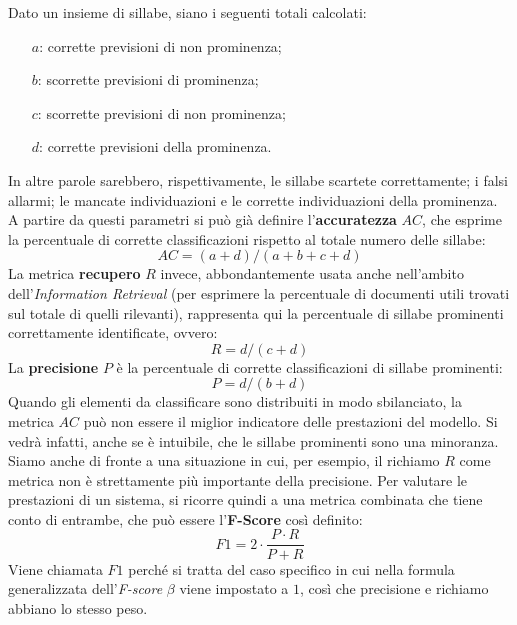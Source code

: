 \documentclass[twoside,twocolumn,11pt]{extarticle}
\theoremstyle{definition}
\begin{document}
		Dato un insieme di sillabe, siano i seguenti totali calcolati:
		\begin{itemize}
			\item[$a$:] corrette previsioni di non prominenza;
			\item[$b$:] scorrette previsioni di prominenza;
			\item[$c$:] scorrette previsioni di non prominenza;
			\item[$d$:] corrette previsioni della prominenza.
		\end{itemize}
		In altre parole sarebbero, rispettivamente, le sillabe scartete correttamente; i falsi allarmi; le mancate individuazioni e le corrette individuazioni della prominenza. A partire da questi parametri si può già definire l'\textbf{accuratezza} $AC$, che esprime la percentuale di corrette classificazioni rispetto al totale numero delle sillabe:
		\begin{equation}\label{eq:ac}
			AC = (a + d) / (a + b + c + d)
		\end{equation}
		La metrica \textbf{recupero} $R$ invece, abbondantemente usata anche nell'ambito dell'\textit{Information Retrieval} (per esprimere la percentuale di documenti utili trovati sul totale di quelli rilevanti), rappresenta qui la percentuale di sillabe prominenti correttamente identificate, ovvero:
		\begin{equation}\label{eq:r}
			R = d / (c + d)
		\end{equation}
		La \textbf{precisione} $P$ è la percentuale di corrette classificazioni di sillabe prominenti:
		\begin{equation}\label{eq:p}
			P = d / (b + d)
		\end{equation}
		Quando gli elementi da classificare sono distribuiti in modo sbilanciato, la metrica $AC$ può non essere il miglior indicatore delle prestazioni del modello. Si vedrà infatti, anche se è intuibile, che le sillabe prominenti sono una minoranza. Siamo anche di fronte a una situazione in cui, per esempio, il richiamo $R$ come metrica non è strettamente più importante della precisione. Per valutare le prestazioni di un sistema, si ricorre quindi a una metrica combinata che tiene conto di entrambe, che può essere l'\textbf{F-Score} così definito:
		\begin{equation}\label{eq:f}
			F1 = 2 \cdot \frac{P \cdot R}{P + R}
		\end{equation}
		Viene chiamata $F1$ perché si tratta del caso specifico in cui nella formula generalizzata dell'\textit{F-score} $\beta$ viene impostato a $1$, così che precisione e richiamo abbiano lo stesso peso.
	
\end{document}
